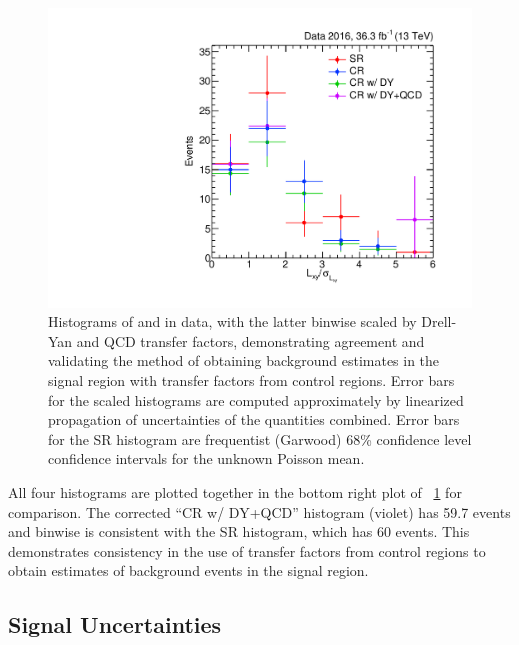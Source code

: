 \begin{figure}[htbp]
  \hspace*{-2em}
  \includegraphics[width=\DSquareWidth]{figures/displaced/BGEST_smallLxySig.pdf}
  \caption[Histograms of  and  in data, with the latter binwise scaled by Drell-Yan and QCD transfer factors, demonstrating agreement and validating the method of obtaining background estimates in the signal region with transfer factors from control regions.]{Histograms of  and  in data, with the latter binwise scaled by Drell-Yan and QCD transfer factors, demonstrating agreement and validating the method of obtaining background estimates in the signal region with transfer factors from control regions. Error bars for the scaled histograms are computed approximately by linearized propagation of uncertainties of the quantities combined. Error bars for the SR histogram are frequentist (Garwood) 68\% confidence level confidence intervals for the unknown Poisson mean.}
  \label{fig:dd:TFLess}
\end{figure}
\clearpage

All four histograms are plotted together in the bottom right plot of \Fig~\ref{fig:dd:TFLess} for comparison.
The corrected ``CR w/ DY+QCD'' histogram (violet) has 59.7 events and binwise is consistent with the SR histogram, which has 60 events.
This demonstrates consistency in the use of transfer factors from control regions to obtain estimates of background events in the signal region.

\subsection{Signal Uncertainties}
